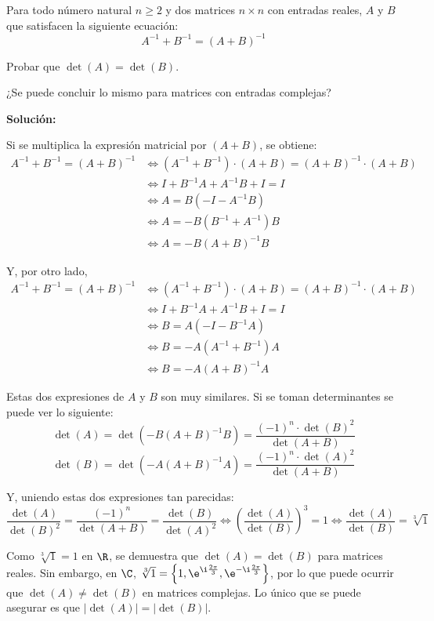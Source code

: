 \documentclass[../../main.tex]{subfiles}
\begin{document}
  \begin{shaded}
    Para todo número natural $n \geq 2$ y dos matrices $n \times n$ con entradas reales, $A$ y $B$ que satisfacen la siguiente ecuación:
    $$
    A^{-1} + B^{-1} = (A + B)^{-1}
    $$

    Probar que $\det{(A)} = \det{(B)}$.

    ¿Se puede concluir lo mismo para matrices con entradas complejas?
  \end{shaded}

  \textbf{Solución:}

  Si se multiplica la expresión matricial por $(A + B)$, se obtiene:
  \begin{equation*}
    \begin{split}
      A^{-1} + B^{-1} = (A + B)^{-1} & \iff
      (A^{-1} + B^{-1}) \cdot (A + B) = (A + B)^{-1} \cdot (A + B) \\ & \iff
      I + B^{-1} A + A^{-1} B + I = I \\ & \iff
      A = B (-I - A^{-1} B) \\ & \iff
      A = -B (B^{-1} + A^{-1}) B \\ & \iff
      A = -B (A + B)^{-1} B
    \end{split}
  \end{equation*}

  Y, por otro lado,
  \begin{equation*}
    \begin{split}
      A^{-1} + B^{-1} = (A + B)^{-1} & \iff
      (A^{-1} + B^{-1}) \cdot (A + B) = (A + B)^{-1} \cdot (A + B) \\ & \iff
      I + B^{-1} A + A^{-1} B + I = I \\ & \iff
      B = A (-I - B^{-1} A) \\ & \iff
      B = -A (A^{-1} + B^{-1}) A \\ & \iff
      B = -A (A + B)^{-1} A
    \end{split}
  \end{equation*}

  Estas dos expresiones de $A$ y $B$ son muy similares. Si se toman determinantes se puede ver lo siguiente:
  $$
  \det{(A)} = \det{\left( -B (A + B)^{-1} B\right)} = \frac{(-1)^n \cdot \det{(B)}^2}{\det{(A + B)}}
  $$
  $$
  \det{(B)} = \det{\left(-A (A + B)^{-1} A\right)} = \frac{(-1)^n \cdot \det{(A)}^2}{\det{(A + B)}}
  $$

  Y, uniendo estas dos expresiones tan parecidas:
  $$
  \frac{\det{(A)}}{\det{(B)}^2} = \frac{(-1)^n}{\det{(A + B)}} = \frac{\det{(B)}}{\det{(A)}^2} \iff \left(\frac{\det{(A)}}{\det{(B)}}\right)^3 = 1 \iff \frac{\det{(A)}}{\det{(B)}} = \sqrt[3]{1}
  $$

  Como $\sqrt[3]{1} = 1$ en $\R$, se demuestra que $\det{(A)} = \det{(B)}$ para matrices reales. Sin embargo, en $\C$, $\sqrt[3]{1} = \left\{ 1, \e^{\i\frac{2\pi}{3}}, \e^{-\i\frac{2\pi}{3}}\right\}$, por lo que puede ocurrir que $\det{(A)} \ne \det{(B)}$ en matrices complejas. Lo único que se puede asegurar es que $|\det{(A)}| = |\det{(B)}|$.
\end{document}

